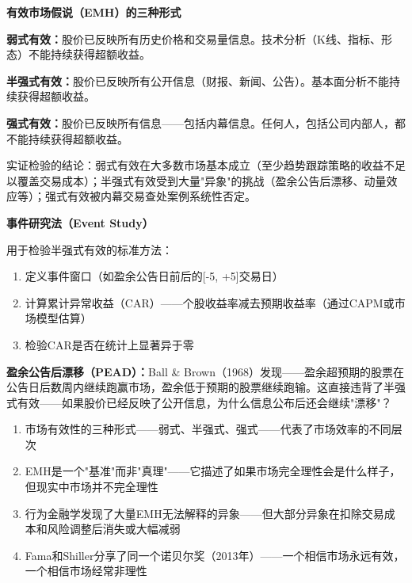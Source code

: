 \documentclass[a4paper,11pt]{ctexbook}
\begin{document}
{\begin{lessonsummary}
\begin{qualitative}
\textbf{有效市场假说（EMH）的三种形式}

\textbf{弱式有效：}股价已反映所有历史价格和交易量信息。技术分析（K线、指标、形态）不能持续获得超额收益。

\textbf{半强式有效：}股价已反映所有公开信息（财报、新闻、公告）。基本面分析不能持续获得超额收益。

\textbf{强式有效：}股价已反映所有信息——包括内幕信息。任何人，包括公司内部人，都不能持续获得超额收益。

实证检验的结论：弱式有效在大多数市场基本成立（至少趋势跟踪策略的收益不足以覆盖交易成本）；半强式有效受到大量"异象"的挑战（盈余公告后漂移、动量效应等）；强式有效被内幕交易查处案例系统性否定。
\end{qualitative}

\begin{quantitative}
\textbf{事件研究法（Event Study）}

用于检验半强式有效的标准方法：
\begin{enumerate}
  \item 定义事件窗口（如盈余公告日前后的[-5, +5]交易日）
  \item 计算累计异常收益（CAR）——个股收益率减去预期收益率（通过CAPM或市场模型估算）
  \item 检验CAR是否在统计上显著异于零
\end{enumerate}

\textbf{盈余公告后漂移（PEAD）：}Ball \& Brown（1968）发现——盈余超预期的股票在公告日后数周内继续跑赢市场，盈余低于预期的股票继续跑输。这直接违背了半强式有效——如果股价已经反映了公开信息，为什么信息公布后还会继续"漂移"？
\end{quantitative}

\begin{lessonsummary}
\begin{enumerate}
  \item 市场有效性的三种形式——弱式、半强式、强式——代表了市场效率的不同层次
  \item EMH是一个"基准"而非"真理"——它描述了如果市场完全理性会是什么样子，但现实中市场并不完全理性
  \item 行为金融学发现了大量EMH无法解释的异象——但大部分异象在扣除交易成本和风险调整后消失或大幅减弱
  \item Fama和Shiller分享了同一个诺贝尔奖（2013年）——一个相信市场永远有效，一个相信市场经常非理性
\end{enumerate}
\end{lessonsummary}


\end{lessonsummary}}
\end{document}
